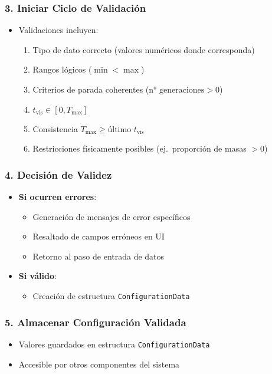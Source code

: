 \subsubsection*{3. Iniciar Ciclo de Validación}
\begin{itemize}
    \item Validaciones incluyen:
    \begin{enumerate}[label=~(\alph*)]
        \item Tipo de dato correcto (valores numéricos donde corresponda)
        \item Rangos lógicos ($\min < \max $)
        \item Criterios de parada coherentes ($\text{n° generaciones} > 0$)
        \item $t_{\text{vis}} \in [0, T_{\max}]$
        \item Consistencia $T_{\max} \geq \text{último } t_{\text{vis}}$
        \item Restricciones físicamente posibles (ej.\ proporción de masas $> 0$)
    \end{enumerate}
\end{itemize}

\subsubsection*{4. Decisión de Validez}
\begin{itemize}
    \item \textbf{Si ocurren errores}:
    \begin{itemize}
        \item Generación de mensajes de error específicos
        \item Resaltado de campos erróneos en UI
        \item Retorno al paso de entrada de datos
    \end{itemize}
    \item \textbf{Si válido}:
    \begin{itemize}
        \item Creación de estructura \texttt{ConfigurationData}
    \end{itemize}
\end{itemize}

\subsubsection*{5. Almacenar Configuración Validada}
\begin{itemize}
    \item Valores guardados en estructura \texttt{ConfigurationData}
    \item Accesible por otros componentes del sistema
\end{itemize}

